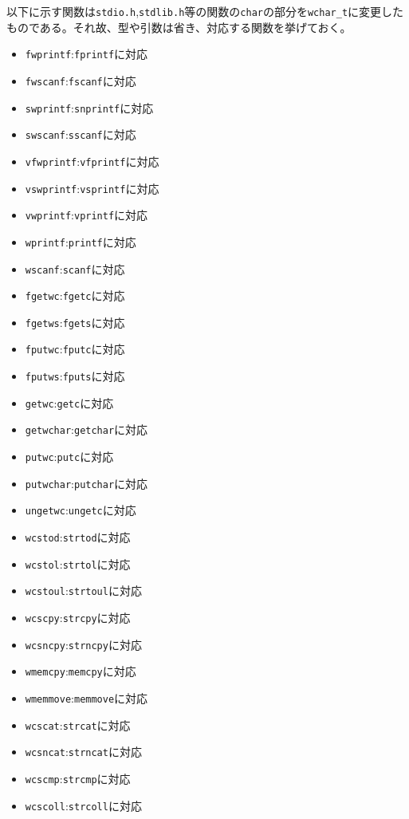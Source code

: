 以下に示す関数は\verb|stdio.h|,\verb|stdlib.h|等の関数の\verb|char|の部分を\verb|wchar_t|に変更したものである。それ故、型や引数は省き、対応する関数を挙げておく。
\begin{multicols}{2}
\begin{itemize}
\item \verb|fwprintf|:\verb|fprintf|に対応
\item \verb|fwscanf|:\verb|fscanf|に対応
\item \verb|swprintf|:\verb|snprintf|に対応
\item \verb|swscanf|:\verb|sscanf|に対応
\item \verb|vfwprintf|:\verb|vfprintf|に対応
\item \verb|vswprintf|:\verb|vsprintf|に対応
\item \verb|vwprintf|:\verb|vprintf|に対応
\item \verb|wprintf|:\verb|printf|に対応
\item \verb|wscanf|:\verb|scanf|に対応
\item \verb|fgetwc|:\verb|fgetc|に対応
\item \verb|fgetws|:\verb|fgets|に対応
\item \verb|fputwc|:\verb|fputc|に対応
\item \verb|fputws|:\verb|fputs|に対応
\item \verb|getwc|:\verb|getc|に対応
\item \verb|getwchar|:\verb|getchar|に対応
\item \verb|putwc|:\verb|putc|に対応
\item \verb|putwchar|:\verb|putchar|に対応
\item \verb|ungetwc|:\verb|ungetc|に対応
\item \verb|wcstod|:\verb|strtod|に対応
\item \verb|wcstol|:\verb|strtol|に対応
\item \verb|wcstoul|:\verb|strtoul|に対応
\item \verb|wcscpy|:\verb|strcpy|に対応
\item \verb|wcsncpy|:\verb|strncpy|に対応
\item \verb|wmemcpy|:\verb|memcpy|に対応
\item \verb|wmemmove|:\verb|memmove|に対応
\item \verb|wcscat|:\verb|strcat|に対応
\item \verb|wcsncat|:\verb|strncat|に対応
\item \verb|wcscmp|:\verb|strcmp|に対応
\item \verb|wcscoll|:\verb|strcoll|に対応

\end{itemize}
\end{multicols}
